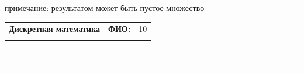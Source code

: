\documentclass[10pt]{exam}
\newcommand{\class}{Дискретная математика}
\newcommand{\examdate}{}
\begin{document}
\begin{questions}
\underline{примечание:} результатом может быть пустое множество


\end{questions}
\newpage
\begin{flushright}
\begin{tabular}{p{2.8in} r l}
\textbf{\class} & \textbf{ФИО:} &10\\

\textbf{\examdate} &&\\
\end{tabular}\\
\end{flushright}
\rule[1ex]{\textwidth}{.1pt}
\end{document}
